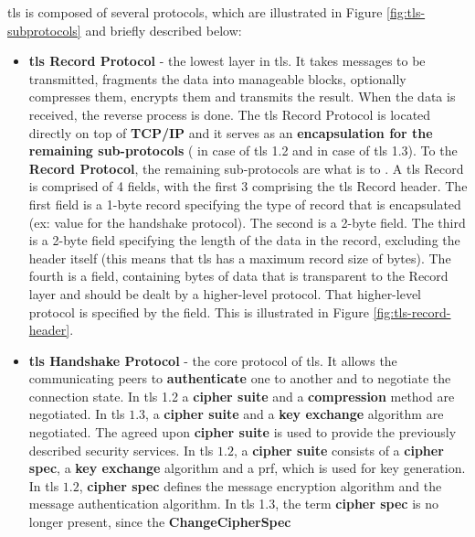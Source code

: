 \documentclass{llncs}
\begin{document}
{\gls{tls} is composed of several protocols, which are illustrated in Figure
\ref{fig:tls-subprotocols} and briefly described below:
\begin{itemize}
  \item \textbf{\gls{tls} Record Protocol} - the lowest layer in \gls{tls}.
  It takes messages to be transmitted, fragments the data into manageable
  blocks, optionally compresses them, encrypts them and transmits the result.
  When the data is received, the reverse process is done. The \gls{tls}
  Record Protocol is located directly on top of \textbf{TCP/IP} and it serves as an
   \textbf{encapsulation for the remaining sub-protocols} ( in case of \gls{tls} 1.2
   and  in case of \gls{tls} 1.3). To the  \textbf{Record Protocol},
   the remaining sub-protocols are what  is to .
   A \gls{tls} Record is comprised of 4 fields, with the first 3 comprising the
   \gls{tls} Record header. The first field is a 1-byte record 
   specifying the type of record that is encapsulated (ex: value 
   for the handshake protocol). The second is a 2-byte  field. The third is a
   2-byte  field specifying the length of the data in the record, excluding
   the header itself (this means that \gls{tls} has a maximum record size
   of  bytes). The fourth is a  field,
   containing  bytes of data that is
   transparent to the Record layer and should be dealt by a higher-level protocol. That higher-level protocol is specified by the  field. This is illustrated in Figure \ref{fig:tls-record-header}.
  \item \textbf{\gls{tls} Handshake Protocol} - the core protocol of \gls{tls}.
  It allows the communicating peers to \textbf{authenticate} one to another and to negotiate the connection state. In \gls{tls} 1.2
  a \textbf{cipher suite} and a \textbf{compression} method are negotiated. In \gls{tls} $1.3$, a \textbf{cipher suite} and a \textbf{key exchange} algorithm are negotiated. The agreed upon \textbf{cipher suite} is used to provide the previously described security services. In
  \gls{tls} $1.2$, a \textbf{cipher suite} consists of a \textbf{cipher spec},
  a \textbf{key exchange} algorithm and a \gls{prf}, which is used for key generation.
  In \gls{tls} $1.2$,
  \textbf{cipher spec} defines the message encryption algorithm and the message
  authentication algorithm. In \gls{tls} 1.3, the term
   \textbf{cipher spec} is no longer present, since the \textbf{ChangeCipherSpec}

\end{itemize}}
\end{document}
